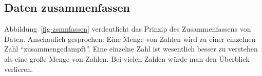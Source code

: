 \documentclass[
  letterpaper,
  oneside,
  open=any]{scrbook}
\theoremstyle{definition}
\theoremstyle{definition}
\theoremstyle{definition}
\theoremstyle{remark}
\begin{document}
\subsection{Daten zusammenfassen}\label{daten-zusammenfassen}

Abbildung~\ref{fig-zsmnfassen} verdeutlicht das Prinzip des
Zusammenfassens von Daten. Anschaulich gesprochen: Eine Menge von Zahlen
wird zu einer einzelnen Zahl \enquote{zusammengedampft}. Eine einzelne
Zahl ist wesentlich besser zu verstehen als eine große Menge von Zahlen.
Bei vielen Zahlen würde man den Überblick verlieren.

\begin{figure}

\begin{minipage}{0.45\linewidth}



\end{minipage}%
%
\begin{minipage}{0.10\linewidth}
~\end{minipage}%
%
\begin{minipage}{0.45\linewidth}

\end{minipage}
\end{figure}
\end{document}
